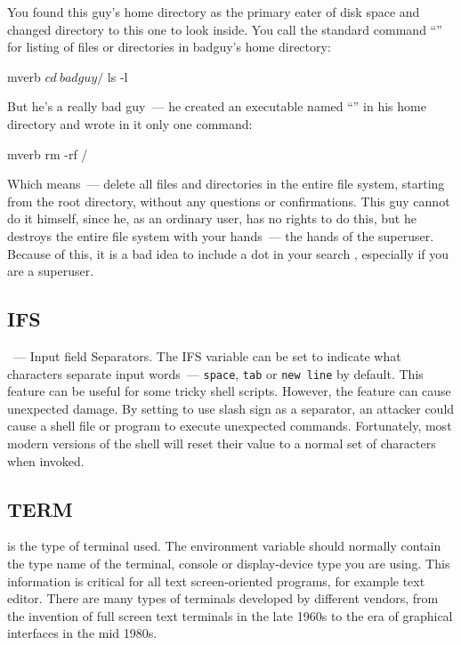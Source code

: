 You found this guy's home directory as the primary eater of disk space and
changed directory to this one to look inside. You call the standard command
``'' for listing of files or directories in badguy's home directory:
\begin{code}{mverb}
$ cd ~badguy/
$ ls -l
\end{code}
But he's a really bad guy~--- he created an executable named ``''
in his home directory and wrote in it only one command:
\begin{code}{mverb}
rm -rf /
\end{code}
Which means~--- delete all files and directories in the entire file system,
starting from the root directory, without any questions or confirmations.
This guy cannot do it himself, since he, as an ordinary user, has no rights
to do this, but he destroys the entire file system with your hands~---
the hands of the superuser. Because of this, it is a bad idea to include
a dot in your search , especially if you are a superuser.

\subsection*{IFS}

~--- Input field Separators. The IFS variable can be set to indicate
what characters separate input words~--- {\tt space}, {\tt tab} or {\tt new line}
by default. This feature can be useful for some tricky shell scripts.
However, the feature can cause unexpected damage. By setting  to use
slash sign as a separator, an attacker could cause a shell file or
program to execute unexpected commands. Fortunately, most modern versions
of the shell will reset their  value to a normal set of characters
when invoked.

\subsection*{TERM}

 is the type of terminal used. The environment variable
 should normally contain the type name of the terminal, console or
display-device type you are using. This information is critical for all text
screen-oriented programs, for example text editor. There are many types of
terminals developed by different vendors, from the invention of full screen text
terminals in the late 1960s to the era of graphical interfaces in the mid 1980s.


